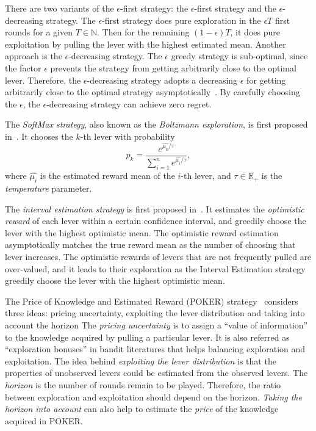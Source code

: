 There are two variants of the $\epsilon$-first strategy: the $\epsilon$-first strategy and the $\epsilon$-decreasing strategy.
The $\epsilon$-first strategy does pure exploration in the $\epsilon T$ first rounds for a given $T \in \mathbb{N}$.
Then for the remaining $(1 - \epsilon ) T$, it does pure exploitation by pulling the lever with the highest estimated mean.
Another approach is the $\epsilon$-decreasing strategy.
The $\epsilon$ greedy strategy is sub-optimal,
since the factor $\epsilon$ prevents the strategy from getting arbitrarily close to the optimal lever.
Therefore, the $\epsilon$-decreasing strategy adopts a decreasing $\epsilon$ 
for getting arbitrarily close to the optimal strategy asymptotically~\cite{Vermorel:2005:MAB}.
By carefully choosing the $\epsilon$, the $\epsilon$-decreasing strategy can achieve zero regret.

The \textit{SoftMax strategy}, also known as the \textit{Boltzmann exploration}, is first proposed in~\cite{Luce:1959:softmax}.
It chooses the $k$-th lever with probability
\begin{displaymath}
p_k = \frac{ e^{ \hat{ \mu_k } / \tau } }{ \sum_{i=1}^{n} e^{ \hat{ \mu_i } / \tau } },
\end{displaymath}
where $\hat{\mu_i}$ is the estimated reward mean of the $i$-th lever,
and $\tau \in \mathbb{R}_+$ is the \textit{temperature} parameter.


The \textit{interval estimation strategy} is first proposed in~\cite{Kaelbling:1993:interval_estimation}.
It estimates the \textit{optimistic reward} of each lever within a certain confidence interval,
and greedily choose the lever with the highest optimistic mean.
The optimistic reward estimation asymptotically matches the true reward mean as the number of choosing that lever increases.
The optimistic rewards of levers that are not frequently pulled are over-valued, 
and it leads to their exploration as the Interval Estimation strategy greedily choose the lever with the highest optimistic mean.

The Price of Knowledge and Estimated Reward (POKER) strategy~\cite{Vermorel:2005:MAB}
considers three ideas: pricing uncertainty, exploiting the lever distribution and taking into account the horizon
The \textit{pricing uncertainty} is to assign a ``value of information'' to the knowledge acquired by pulling a particular lever.
It is also referred as ``exploration bonuses'' in bandit literatures that helps balancing exploration and exploitation.
The idea behind \textit{exploiting the lever distribution} is that
the properties of unobserved levers could be estimated from the observed levers.
The \textit{horizon} is the number of rounds remain to be played.
Therefore, the ratio between exploration and exploitation should depend on the horizon.
\textit{Taking the horizon into account} can also help to estimate the \textit{price} of the knowledge acquired in POKER.

